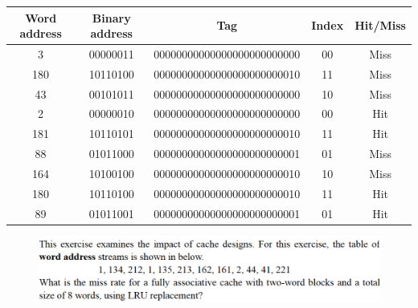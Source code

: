 \documentclass[cn,12pt]{homework}
\begin{document}
\begin{solution}
\begin{center}
\begin{tabular}{|c|c|c|c|c|}
\hline
Word address & Binary address & Tag & Index & Hit/Miss \\
\hline
3   & 00000011        & 00000000000000000000000000      & 00             & Miss \\
180 & 10110100        & 00000000000000000000000010      & 11             & Miss \\
43  & 00101011        & 00000000000000000000000000      & 10             & Miss \\
2   & 00000010        & 00000000000000000000000000      & 00             & Hit  \\
181 & 10110101        & 00000000000000000000000010      & 11             & Hit  \\
88  & 01011000        & 00000000000000000000000001      & 01             & Miss \\
164 & 10100100        & 00000000000000000000000010      & 10             & Miss \\
180 & 10110100        & 00000000000000000000000010      & 11             & Hit  \\
89  & 01011001        & 00000000000000000000000001      & 01             & Hit  \\
\hline
\end{tabular}
\end{center}


\end{solution}
\newpage





\begin{problem}
  \quad
  \begin{figure}[H]
    \centering
    \includegraphics[width=1\textwidth]{./figures/image4.png}
    \label{fig:pro1}
  \end{figure}

\end{problem}
\end{document}
